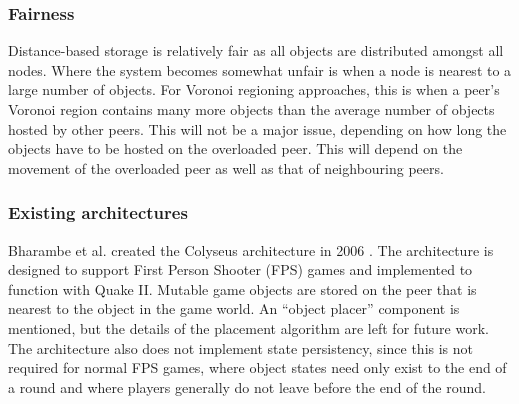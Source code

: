\documentclass[10pt,a4paper,journal,cspaper,compsoc]{IEEEtran}
\begin{document}
\subsubsection{Fairness}
Distance-based storage is relatively fair as all objects are distributed amongst all nodes. Where the system becomes somewhat unfair is when a node
is nearest to a large number of objects. For Voronoi regioning approaches, this is when a peer's Voronoi region contains many more objects than the
average number of objects hosted by other peers. This will not be a major issue, depending on how long the objects have to be hosted on the
overloaded peer. This will depend on the movement of the overloaded peer as well as that of neighbouring peers.

\subsubsection{Existing architectures}
\label{distance_based_existing_archs}

Bharambe et al. created the Colyseus architecture in 2006 \cite{colyseus_distance_based}. The architecture is designed to support First Person
Shooter (FPS) games and implemented to function with Quake II. Mutable game objects are stored on the peer that is nearest to the object in the game
world. An ``object placer'' component is mentioned, but the details of the placement algorithm are left for future work. The architecture also does
not implement state persistency, since this is not required for normal FPS games, where object states need only exist to the end of a round and where
players generally do not leave before the end of the round.
\end{document}
